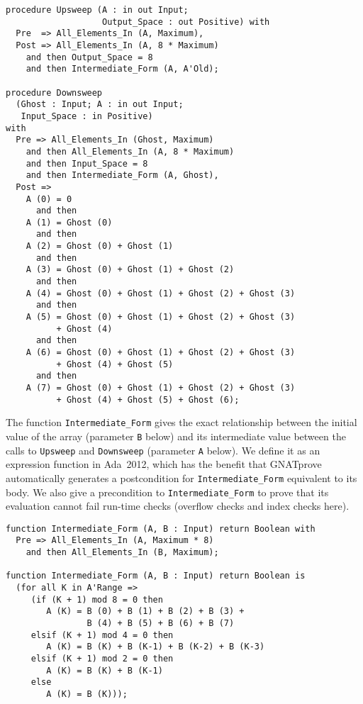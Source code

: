 \documentclass[sttt,draft]{svjour}
\newcommand{\gnatprove}{GNATprove\xspace}
\newcommand{\adatwtw}{Ada~2012\xspace}
\begin{document}
\begin{footnotesize}
\begin{verbatim}
procedure Upsweep (A : in out Input;
                   Output_Space : out Positive) with
  Pre  => All_Elements_In (A, Maximum),
  Post => All_Elements_In (A, 8 * Maximum)
    and then Output_Space = 8
    and then Intermediate_Form (A, A'Old);

procedure Downsweep
  (Ghost : Input; A : in out Input;
   Input_Space : in Positive)
with
  Pre => All_Elements_In (Ghost, Maximum)
    and then All_Elements_In (A, 8 * Maximum)
    and then Input_Space = 8
    and then Intermediate_Form (A, Ghost),
  Post =>
    A (0) = 0
      and then
    A (1) = Ghost (0)
      and then
    A (2) = Ghost (0) + Ghost (1)
      and then
    A (3) = Ghost (0) + Ghost (1) + Ghost (2)
      and then
    A (4) = Ghost (0) + Ghost (1) + Ghost (2) + Ghost (3)
      and then
    A (5) = Ghost (0) + Ghost (1) + Ghost (2) + Ghost (3)
          + Ghost (4)
      and then
    A (6) = Ghost (0) + Ghost (1) + Ghost (2) + Ghost (3)
          + Ghost (4) + Ghost (5)
      and then
    A (7) = Ghost (0) + Ghost (1) + Ghost (2) + Ghost (3)
          + Ghost (4) + Ghost (5) + Ghost (6);
\end{verbatim}
\end{footnotesize}

The function \verb|Intermediate_Form| gives the exact relationship between the
initial value of the array (parameter \verb|B| below) and its intermediate
value between the calls to \verb|Upsweep| and \verb|Downsweep| (parameter
\verb|A| below). We define it as an expression function in \adatwtw, which has
the benefit that \gnatprove automatically generates a postcondition for
\verb|Intermediate_Form| equivalent to its body. We also give a precondition to
\verb|Intermediate_Form| to prove that its evaluation cannot fail run-time
checks (overflow checks and index checks here).

\begin{footnotesize}
\begin{verbatim}
function Intermediate_Form (A, B : Input) return Boolean with
  Pre => All_Elements_In (A, Maximum * 8)
    and then All_Elements_In (B, Maximum);

function Intermediate_Form (A, B : Input) return Boolean is
  (for all K in A'Range =>
     (if (K + 1) mod 8 = 0 then
        A (K) = B (0) + B (1) + B (2) + B (3) +
                B (4) + B (5) + B (6) + B (7)
     elsif (K + 1) mod 4 = 0 then
        A (K) = B (K) + B (K-1) + B (K-2) + B (K-3)
     elsif (K + 1) mod 2 = 0 then
        A (K) = B (K) + B (K-1)
     else
        A (K) = B (K)));
\end{verbatim}
\end{footnotesize}
\end{document}
